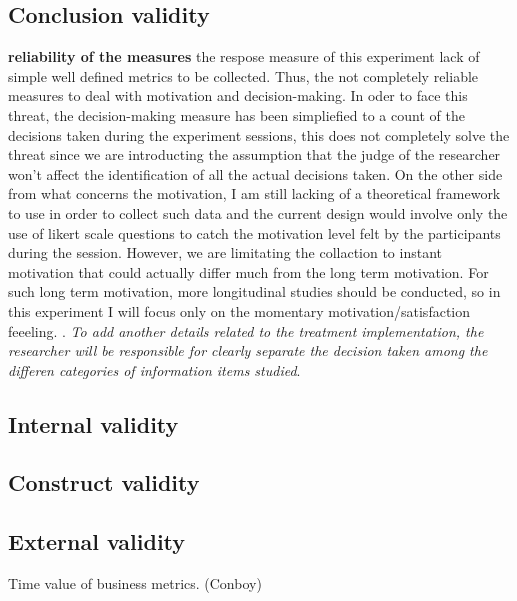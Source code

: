 \documentclass[runningheads]{llncs}
\begin{document}
\subsection{Conclusion validity}

\textbf{reliability of the measures} the respose measure of this experiment lack of simple well defined metrics to be collected. Thus, the not completely reliable measures to deal with motivation and decision-making. In oder to face this threat, the decision-making measure has been simpliefied to a count of the decisions taken during the experiment sessions, this does not completely solve the threat since we are introducting the assumption that the judge of the researcher won't affect the identification of all the actual decisions taken. On the other side from what concerns the motivation, I am still lacking of a theoretical framework to use in order to collect such data and the current design would involve only the use of likert scale questions to catch the motivation level felt by the participants during the session. However, we are limitating the collaction to instant motivation that could actually differ much from the long term motivation. For such long term motivation, more longitudinal studies should be conducted, so in this experiment I will focus only on the momentary motivation/satisfaction feeeling. \textcs{\textcolor{red}{need for theory or studies to back it up}}. \textit{To add another details related to the treatment implementation, the researcher will be responsible for clearly separate the decision taken among the differen categories of information items studied}.

\subsection{Internal validity}



\subsection{Construct validity}

\subsection{External validity}


Time value of business metrics. (Conboy)


%
%
%
% 
% 
%
\end{document}
